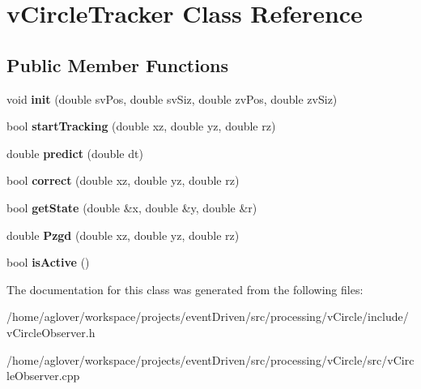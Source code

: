 \hypertarget{classvCircleTracker}{\section{v\-Circle\-Tracker Class Reference}
\label{classvCircleTracker}
}
\subsection*{Public Member Functions}
\begin{DoxyCompactItemize}
\item 
\hypertarget{classvCircleTracker_af2b25d915f5c517b64514409fb993703}{void {\bfseries init} (double sv\-Pos, double sv\-Siz, double zv\-Pos, double zv\-Siz)}\label{classvCircleTracker_af2b25d915f5c517b64514409fb993703}

\item 
\hypertarget{classvCircleTracker_aab8929299dc8caf0393d4c1565a05995}{bool {\bfseries start\-Tracking} (double xz, double yz, double rz)}\label{classvCircleTracker_aab8929299dc8caf0393d4c1565a05995}

\item 
\hypertarget{classvCircleTracker_ae56bc313864551e5f8b09dedebec0d79}{double {\bfseries predict} (double dt)}\label{classvCircleTracker_ae56bc313864551e5f8b09dedebec0d79}

\item 
\hypertarget{classvCircleTracker_ad84e5c23fec79d12f1f5007176d4fe4f}{bool {\bfseries correct} (double xz, double yz, double rz)}\label{classvCircleTracker_ad84e5c23fec79d12f1f5007176d4fe4f}

\item 
\hypertarget{classvCircleTracker_a41cfcda05d1e9e46bf98636c045cc326}{bool {\bfseries get\-State} (double \&x, double \&y, double \&r)}\label{classvCircleTracker_a41cfcda05d1e9e46bf98636c045cc326}

\item 
\hypertarget{classvCircleTracker_ad1d7602e56934c432c46aaeb639a5015}{double {\bfseries Pzgd} (double xz, double yz, double rz)}\label{classvCircleTracker_ad1d7602e56934c432c46aaeb639a5015}

\item 
\hypertarget{classvCircleTracker_a99d43513683806249f7bdc36a8879b4f}{bool {\bfseries is\-Active} ()}\label{classvCircleTracker_a99d43513683806249f7bdc36a8879b4f}

\end{DoxyCompactItemize}


The documentation for this class was generated from the following files\-:\begin{DoxyCompactItemize}
\item 
/home/aglover/workspace/projects/event\-Driven/src/processing/v\-Circle/include/v\-Circle\-Observer.\-h\item 
/home/aglover/workspace/projects/event\-Driven/src/processing/v\-Circle/src/v\-Circle\-Observer.\-cpp\end{DoxyCompactItemize}
